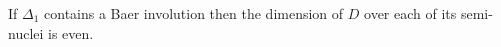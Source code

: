 If $\Delta_1$ contains a Baer involution then the dimension of $D$ over each of its semi-nuclei is even.
